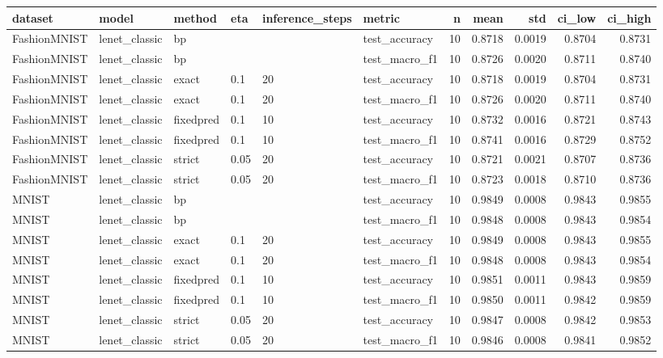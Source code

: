 \begin{tabular}{llllllrrrrr}
\toprule
dataset & model & method & eta & inference_steps & metric & n & mean & std & ci_low & ci_high \\
\midrule
FashionMNIST & lenet_classic & bp &  &  & test_accuracy & 10 & 0.8718 & 0.0019 & 0.8704 & 0.8731 \\
FashionMNIST & lenet_classic & bp &  &  & test_macro_f1 & 10 & 0.8726 & 0.0020 & 0.8711 & 0.8740 \\
FashionMNIST & lenet_classic & exact & 0.1 & 20 & test_accuracy & 10 & 0.8718 & 0.0019 & 0.8704 & 0.8731 \\
FashionMNIST & lenet_classic & exact & 0.1 & 20 & test_macro_f1 & 10 & 0.8726 & 0.0020 & 0.8711 & 0.8740 \\
FashionMNIST & lenet_classic & fixedpred & 0.1 & 10 & test_accuracy & 10 & 0.8732 & 0.0016 & 0.8721 & 0.8743 \\
FashionMNIST & lenet_classic & fixedpred & 0.1 & 10 & test_macro_f1 & 10 & 0.8741 & 0.0016 & 0.8729 & 0.8752 \\
FashionMNIST & lenet_classic & strict & 0.05 & 20 & test_accuracy & 10 & 0.8721 & 0.0021 & 0.8707 & 0.8736 \\
FashionMNIST & lenet_classic & strict & 0.05 & 20 & test_macro_f1 & 10 & 0.8723 & 0.0018 & 0.8710 & 0.8736 \\
MNIST & lenet_classic & bp &  &  & test_accuracy & 10 & 0.9849 & 0.0008 & 0.9843 & 0.9855 \\
MNIST & lenet_classic & bp &  &  & test_macro_f1 & 10 & 0.9848 & 0.0008 & 0.9843 & 0.9854 \\
MNIST & lenet_classic & exact & 0.1 & 20 & test_accuracy & 10 & 0.9849 & 0.0008 & 0.9843 & 0.9855 \\
MNIST & lenet_classic & exact & 0.1 & 20 & test_macro_f1 & 10 & 0.9848 & 0.0008 & 0.9843 & 0.9854 \\
MNIST & lenet_classic & fixedpred & 0.1 & 10 & test_accuracy & 10 & 0.9851 & 0.0011 & 0.9843 & 0.9859 \\
MNIST & lenet_classic & fixedpred & 0.1 & 10 & test_macro_f1 & 10 & 0.9850 & 0.0011 & 0.9842 & 0.9859 \\
MNIST & lenet_classic & strict & 0.05 & 20 & test_accuracy & 10 & 0.9847 & 0.0008 & 0.9842 & 0.9853 \\
MNIST & lenet_classic & strict & 0.05 & 20 & test_macro_f1 & 10 & 0.9846 & 0.0008 & 0.9841 & 0.9852 \\
\bottomrule
\end{tabular}
